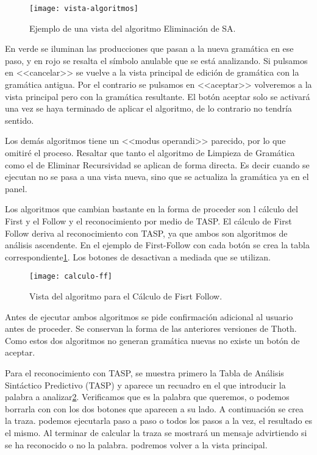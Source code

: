 \begin{figure}[h]
\centering
\texttt{[image: vista-algoritmos]}
\caption{Ejemplo de una vista del algoritmo Eliminación de SA.}
\label{fig:6.8}
\end{figure}

En verde se iluminan las producciones que pasan a la nueva gramática en ese paso, y en rojo se resalta el símbolo anulable que se está analizando. Si pulsamos en <<cancelar>> se vuelve a la vista principal de edición de gramática con la gramática antigua. Por el contrario se pulsamos en <<aceptar>> volveremos a la vista principal pero con la gramática resultante. El botón aceptar solo se activará una vez se haya terminado de aplicar el algoritmo, de lo contrario no tendría sentido. 

Los demás algoritmos tiene un <<modus operandi>> parecido, por lo que omitiré el proceso. Resaltar que tanto el algoritmo de Limpieza de Gramática como el de Eliminar Recursividad se aplican de forma directa. Es decir cuando se ejecutan no se pasa a una vista nueva, sino que se actualiza la gramática ya en el panel.

Los algoritmos que cambian bastante en la forma de proceder son l cálculo del First y el Follow y el reconocimiento por medio de TASP. El cálculo de First Follow deriva al reconocimiento con TASP, ya que ambos son algoritmos de análisis ascendente. En el ejemplo de First-Follow con cada botón se crea la tabla correspondiente\ref{fig:6.8}. Los botones de desactivan a mediada que se utilizan.

\begin{figure}[h]
\centering
\texttt{[image: calculo-ff]}
\caption{Vista del algoritmo para el Cálculo de Fisrt Follow.}
\label{fig:6.9}
\end{figure}

Antes de ejecutar ambos algoritmos se pide confirmación adicional al usuario antes de proceder. Se conservan la forma de las anteriores versiones de Thoth. Como estos dos algoritmos no generan gramática nuevas no existe un botón de aceptar.

Para el reconocimiento con TASP, se muestra primero la Tabla de Análisis Sintáctico Predictivo (TASP) y aparece un recuadro en el que introducir la palabra a analizar\ref{fig:6.9}. Verificamos que es la palabra que queremos, o podemos borrarla con con los dos botones que aparecen a su lado. A continuación se crea la traza. podemos ejecutarla paso a paso o todos los pasos a la vez, el resultado es el mismo. Al terminar de calcular la traza se mostrará un mensaje advirtiendo si se ha reconocido o no la palabra. podremos volver a la vista principal.

